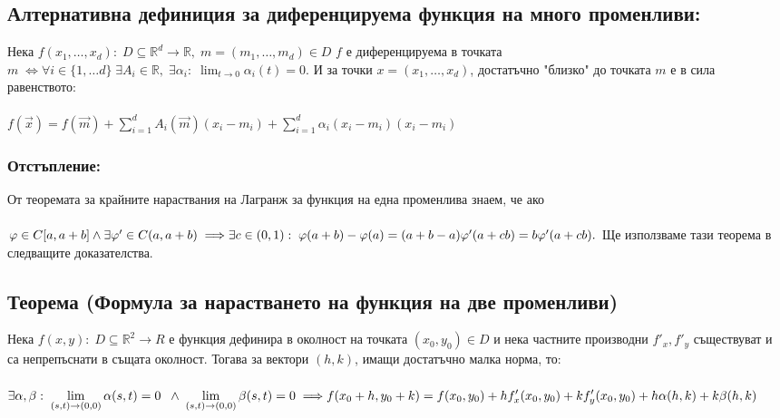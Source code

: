 \documentclass[14pt]{extarticle}
\newcommand{\R}{\mathbb{R}}
\newcommand{\Sum}{\displaystyle\sum}
\newcommand{\Lim}[2]{\displaystyle\lim_{#1 \to #2}}
\newcommand{\Vector}[1]{\overrightarrow{#1}}
\begin{document}
\subsection*{Алтернативна дефиниция за диференцируема функция на много променливи:}
Нека \(f(x_1, \dots, x_d) : \; D \subseteq \R^d \to \R, \; m = (m_1, \dots, m_d) \in D \) \(f\) е диференцируема в точката \(m \; \iff
\forall i \in \{1, \dots d\} \; \exists A_i \in \R, \; \exists \alpha_i : \; \Lim{t}{0} \alpha_i(t) = 0 \). И за точки \(x = (x_1, \dots, x_d)\), достатъчно "близко" до точката \(m\) е в сила равенството: \\\\
\(f(\Vector{x}) = f(\Vector{m}) + \Sum_{i = 1}^d A_i(\Vector{m})(x_i - m_i) + \Sum_{i = 1}^d \alpha_{i}(x_i - m_i)(x_i - m_i) \)
\subsubsection*{Отстъпление:}
От теоремата за крайните нараствания на Лагранж за функция на една променлива знаем, че ако \\\\
\(\varphi \in C[a, a + b] \land \exists \varphi' \in C(a, a + b) \implies \\\\
\exists c \in (0, 1) : \; \varphi(a + b) - \varphi(a) = (a + b - a)\varphi'(a + cb) = b\varphi'(a + cb).\) Ще използваме тази теорема в следващите доказателства.
\subsection*{Теорема (Формула за нарастването на функция на две променливи)}
Нека \(f(x, y) : \; D \subseteq \R^2 \to R\) е функция дефинира в околност на точката \((x_0, y_0) \in D\) и нека частните производни \(f'_x, f'_y\) съществуват и са непрепъснати в същата околност. Тогава за вектори \((h, k)\), имащи достатъчно малка норма, то: \\\\
\(\exists \alpha, \beta : \; \Lim{(s, t)}{(0, 0)} \alpha(s, t) = 0 \; \; \land \; \Lim{(s, t)}{(0, 0)} \beta(s, t) = 0 \implies \\\\
f(x_0 + h, y_0 + k) = f(x_0, y_0) + hf'_x(x_0, y_0) + kf'_y(x_0, y_0) + h\alpha(h, k) + k\beta(h,k) \)
\end{document}
